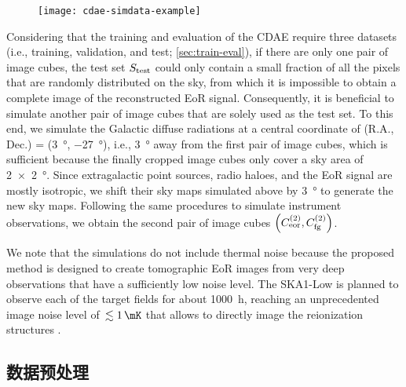 \begin{figure}[htp]
  \centering
  \texttt{[image: cdae-simdata-example]}
  \label{fig:cdae-simdata}
\end{figure}

Considering that the training and evaluation of the CDAE require three
datasets (i.e., training, validation, and test; \autoref{sec:train-eval}),
if there are only one pair of image cubes, the test set $S_{\mathrm{test}}$
could only contain a small fraction of all the pixels that are randomly
distributed on the sky, from which it is impossible to obtain a complete
image of the reconstructed EoR signal.
Consequently, it is beneficial to simulate another pair of image cubes
that are solely used as the test set.
To this end, we simulate the Galactic diffuse radiations at a central
coordinate of (R.A., Dec.\@) = (\SI{3}{\degree}, \SI{-27}{\degree}), i.e.,
\SI{3}{\degree} away from the first pair of image cubes, which is
sufficient because the finally cropped image cubes only cover a sky area of
\SI{2 x 2}{\degree}.
Since extragalactic point sources, radio haloes, and the EoR signal are
mostly isotropic, we shift their sky maps simulated above by
\SI{3}{\degree} to generate the new sky maps.
Following the same procedures to simulate instrument observations, we
obtain the second pair of image cubes
$\left( C_{\mathrm{eor}}^{(2)}, C_{\mathrm{fg}}^{(2)} \right)$.

We note that the simulations do not include thermal noise because the
proposed method is designed to create tomographic EoR images from very deep
observations that have a sufficiently low noise level.
The SKA1-Low is planned to observe each of the target fields for
about \SI{1000}{\hour}, reaching an unprecedented image noise level of
$\,\lesssim \SI{1}{\mK}$ that allows to directly image the reionization
structures
\cite{mellema2013,mellema2015,koopmans2015}.

\subsection{数据预处理}
\label{sec:preprocessing}

